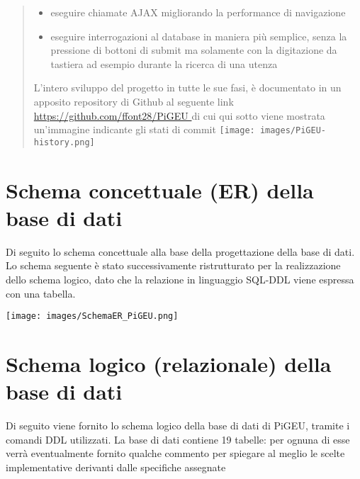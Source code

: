 \documentclass{article}
\begin{document}
\begin{abstract}
\begin{itemize}
            \begin{itemize}
                \item eseguire chiamate AJAX migliorando la performance di navigazione
                \item eseguire interrogazioni al database in maniera più semplice, senza la pressione di bottoni di submit ma solamente con la digitazione da tastiera ad esempio durante la ricerca di una utenza
            \end{itemize}
        \end{itemize}
        L'intero sviluppo del progetto in tutte le sue fasi, è documentato in un apposito repository di Github al seguente link \url{https://github.com/ffont28/PiGEU } di cui qui sotto viene mostrata un'immagine indicante gli stati di commit
        \texttt{[image: images/PiGEU-history.png]}
    \end{abstract}

    \pagebreak

    \tableofcontents

    \pagebreak

    \section{Schema concettuale (ER) della base di dati}
    Di seguito lo schema concettuale alla base della progettazione della base di dati.
    Lo schema seguente è stato successivamente ristrutturato per la realizzazione dello schema logico, dato che la relazione in linguaggio SQL-DDL viene espressa con una tabella.


    \texttt{[image: images/SchemaER\_PiGEU.png]}

    \section{Schema logico (relazionale) della base di dati}
    Di seguito viene fornito lo schema logico della base di dati di PiGEU, tramite i comandi DDL utilizzati. La base di dati contiene 19 tabelle: per ognuna di esse verrà eventualmente fornito qualche commento per spiegare al meglio le scelte implementative derivanti dalle specifiche assegnate

\end{document}
